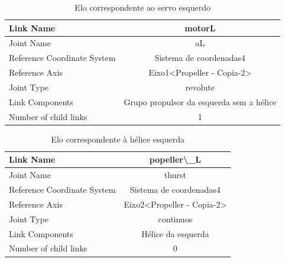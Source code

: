\begin{table}[htbp]
\centering
\begin{tabular}{|l|c|c|c|c|}
\hline
Link Name  & \multicolumn{4}{c|}{motorL} \\
\hline
Joint Name  & \multicolumn{4}{c|}{aL} \\
\hline
Reference Coordinate System   & \multicolumn{4}{c|}{Sistema de coordenadas4} \\
\hline
Reference Axis  & \multicolumn{4}{c|}{Eixo1<Propeller - Copia-2>} \\
\hline
Joint Type  & \multicolumn{4}{c|}{revolute} \\
\hline
Link Components   & \multicolumn{4}{c|}{Grupo propulsor da esquerda sem a hélice} \\
\hline
Number of child links & \multicolumn{4}{c|}{1} \\
\hline
\end{tabular}%
\caption{Elo correspondente ao servo esquerdo}
\label{tab:servoesquerdo}%
\end{table}%

\begin{table}[htbp]
\centering
\begin{tabular}{|l|c|c|c|c|}
\hline
Link Name  & \multicolumn{4}{c|}{popeller\textbackslash{}\_L} \\
\hline
Joint Name  & \multicolumn{4}{c|}{thurst} \\
\hline
Reference Coordinate System   & \multicolumn{4}{c|}{Sistema de coordenadas4} \\
\hline
Reference Axis  & \multicolumn{4}{c|}{Eixo2<Propeller - Copia-2>} \\
\hline
Joint Type  & \multicolumn{4}{c|}{continuos} \\
\hline
Link Components   & \multicolumn{4}{c|}{Hélice da esquerda} \\
\hline
Number of child links  & \multicolumn{4}{c|}{0} \\
\hline
\end{tabular}%
\caption{Elo correspondente à hélice esquerda}
\label{tab:hélice esquerda}%
\end{table}%

